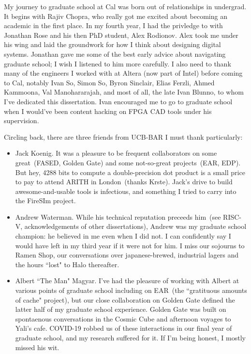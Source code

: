 My journey to graduate school at Cal was born out of relationships in
undergrad. It begins with Rajiv Chopra, who really got me excited about
becoming an academic in the first place. In my fourth year, I had the privledge
to with Jonathan Rose and his then PhD student, Alex Rodionov. Alex took me
under his wing and laid the groundwork for how I think about designing digital
systems. Jonathan gave me some of the best early advice about navigating
graduate school; I wish I listened to him more carefully. I also need to thank
many of the engineers I worked with at Altera (now part of Intel) before coming to Cal, notably
Ivan So, Simon So, Byron Sinclair, Elias Ferzli, Ahmed Kammoona, Val
Manohararajah, and most of all, the late Ivan Blunno, to whom I've dedicated
this dissertation. Ivan encouraged me to go to graduate school when I would've
been content hacking on FPGA CAD tools under his supervision.

Circling back, there are three friends from UCB-BAR I must thank particularly:
\begin{itemize}
\item Jack Koenig. It was a pleasure to be frequent collaborators on some
great~(FASED, Golden Gate) and some not-so-great projects~(EAR, EDP). But hey,
4288 bits to compute a double-precision dot product is a small price to pay to
attend ARITH in London~(thanks Krste). Jack's drive to build awesome-and-usable
tools is infectious, and something I tried to carry into the FireSIm project.

\item Andrew Waterman. While his
technical reputation preceeds him~(see RISC-V, acknowledgements of other
dissertations), Andrew was my graduate school champion: he believed in me even when I did not.
I can confidently say I would have left in my
third year if it were not for him. I miss our sojourns to Ramen Shop,
our conversations over japanese-brewed, industrial lagers and the hours
``lost" to Halo thereafter.

\item Albert ``The Man" Magyar. I've had the pleasure of working with Albert at
various points of graduate school including on EAR~(the ``gratituous
amounts of cache" project), but our close collaboration on Golden Gate
defined the latter half of my graduate school experience. Golden Gate
was built on spontaenous conversations in the Cosmic Cube and afternoon
voyages to Yali's cafe. COVID-19 robbed us of these interactions in our
final year of graduate school, and my research suffered for it. If I'm
being honest, I mostly missed his wit.
\end{itemize}

